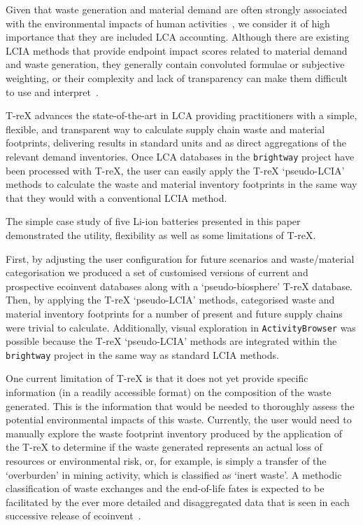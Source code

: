 Given that waste generation and material demand are often strongly associated with the environmental impacts of human activities~\citep{laurenti2023wastefootprint,steinmann2017resourcefootprints, demirer2019wastefootprint}, we consider it of high importance that they are included LCA accounting. Although there are existing LCIA methods that provide endpoint impact scores related to material demand and waste generation, they generally contain convoluted formulae or subjective weighting, or their complexity and lack of transparency can make them difficult to use and interpret~\citep{foen2021ecofactors,hauschild2003edip,cen2019en15804, arvidsson2020csi,foen2021ecofactors}.

T-reX advances the state-of-the-art in LCA providing practitioners with a simple, flexible, and transparent way to calculate supply chain waste and material footprints, delivering results in standard units and as direct aggregations of the relevant demand inventories. Once LCA databases in the \texttt{brightway} project have been processed with T-reX, the user can easily apply the T-reX `pseudo-LCIA' methods to calculate the waste and material inventory footprints in the same way that they would with a conventional LCIA method.

The simple case study of five Li-ion batteries presented in this paper demonstrated the  utility, flexibility as well as some limitations of T-reX.

First, by adjusting the user configuration for future scenarios and waste/material categorisation we produced a set of customised versions of current and prospective ecoinvent databases along with a `pseudo-biosphere' T-reX database. Then, by applying the T-reX `pseudo-LCIA' methods, categorised waste and material inventory footprints for a number of present and future supply chains were trivial to calculate. Additionally, visual exploration in \texttt{ActivityBrowser} was possible because the T-reX `pseudo-LCIA' methods are integrated within the \texttt{brightway} project in the same way as standard LCIA methods.

One current limitation of T-reX is that it does not yet provide specific information (in a readily accessible format) on the composition of the waste generated. This is the information that would be needed to thoroughly assess the potential environmental impacts of this waste. Currently, the user would need to manually explore the waste footprint inventory produced by the application of the T-reX to determine if the waste generated represents an actual loss of resources or environmental risk, or, for example, is simply a transfer of the `overburden' in mining activity, which is classified as `inert waste'. A methodic classification of waste exchanges and the end-of-life fates is expected to be facilitated by the ever more detailed and disaggregated data that is seen in each successive release of ecoinvent~\citep{fitzgerald2023ecoinventdocumentation}.

